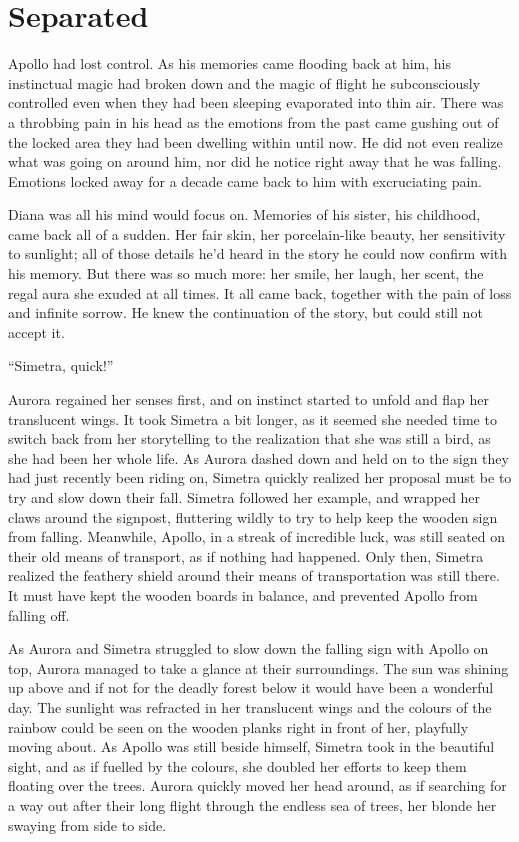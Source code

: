 \chapter{Separated}
\label{cha:separated}
Apollo had lost control. As his memories came flooding back at him, his instinctual magic had broken down and the magic of flight he subconsciously controlled even when they had been sleeping evaporated into thin air. There was a throbbing pain in his head as the emotions from the past came gushing out of the locked area they had been dwelling within until now. He did not even realize what was going on around him, nor did he notice right away that he was falling. Emotions locked away for a decade came back to him with excruciating pain.

Diana was all his mind would focus on. Memories of his sister, his childhood, came back all of a sudden. Her fair skin, her porcelain-like beauty, her sensitivity to sunlight; all of those details he'd heard in the story he could now confirm with his memory. But there was so much more: her smile, her laugh, her scent, the regal aura she exuded at all times. It all came back, together with the pain of loss and infinite sorrow. He knew the continuation of the story, but could still not accept it.

\fancybreaker{}

\enquote{Simetra, quick!}

Aurora regained her senses first, and on instinct started to unfold and flap her translucent wings. It took Simetra a bit longer, as it seemed she needed time to switch back from her storytelling to the realization that she was still a bird, as she had been her whole life. As Aurora dashed down and held on to the sign they had just recently been riding on, Simetra quickly realized her proposal must be to try and slow down their fall. Simetra followed her example, and wrapped her claws around the signpost, fluttering wildly to try to help keep the wooden sign from falling. Meanwhile, Apollo, in a streak of incredible luck, was still seated on their old means of transport, as if nothing had happened. Only then, Simetra realized the feathery shield around their means of transportation was still there. It must have kept the wooden boards in balance, and prevented Apollo from falling off.

As Aurora and Simetra struggled to slow down the falling sign with Apollo on top, Aurora managed to take a glance at their surroundings. The sun was shining up above and if not for the deadly forest below it would have been a wonderful day. The sunlight was refracted in her translucent wings and the colours of the rainbow could be seen on the wooden planks right in front of her, playfully moving about. As Apollo was still beside himself, Simetra took in the beautiful sight, and as if fuelled by the colours, she doubled her efforts to keep them floating over the trees. Aurora quickly moved her head around, as if searching for a way out after their long flight through the endless sea of trees, her blonde her swaying from side to side.

